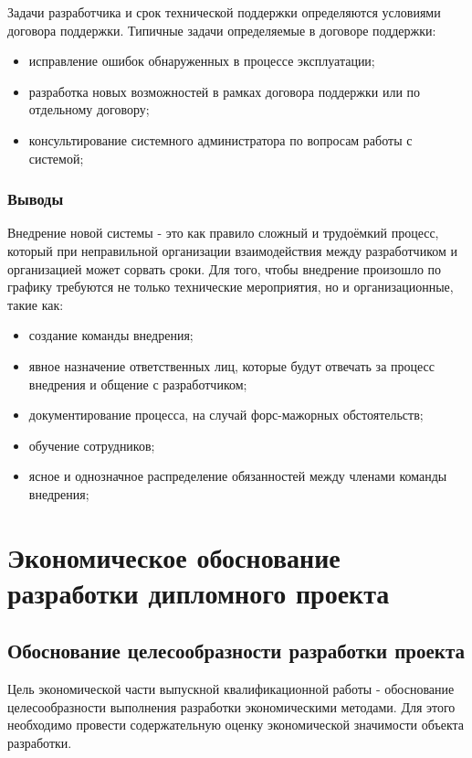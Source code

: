 \documentclass[utf8,usehyperref,12pt]{G7-32}
\begin{document}
Задачи разработчика и срок технической поддержки определяются условиями договора поддержки. Типичные задачи определяемые в договоре поддержки:
\begin{itemize}
 \item исправление ошибок обнаруженных в процессе эксплуатации;
 \item разработка новых возможностей в рамках договора поддержки или по отдельному договору;
 \item консультирование системного администратора по вопросам работы с системой; 
\end{itemize}

\subsection{Выводы}
Внедрение новой системы - это как правило сложный и трудоёмкий процесс, который при неправильной организации взаимодействия между разработчиком и организацией может сорвать сроки. Для того, чтобы внедрение произошло по графику требуются не только технические мероприятия, но и организационные, такие как: 
\begin{itemize}
 \item создание команды внедрения;
 \item явное назначение ответственных лиц, которые будут отвечать за процесс внедрения и общение с разработчиком;
 \item документирование процесса, на случай форс-мажорных обстоятельств;
 \item обучение сотрудников;
 \item ясное и однозначное распределение обязанностей между членами команды внедрения;
\end{itemize}



\chapter{Экономическое обоснование разработки дипломного проекта}
\section{Обоснование целесообразности разработки проекта}

Цель экономической части выпускной квалификационной работы - обоснование целесообразности выполнения разработки экономическими методами. Для этого необходимо провести содержательную оценку экономической значимости объекта разработки.
\end{document}
